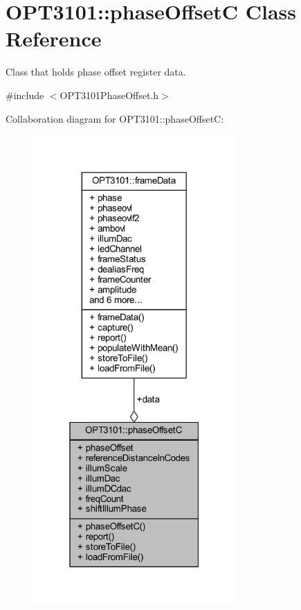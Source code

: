 \hypertarget{class_o_p_t3101_1_1phase_offset_c}{}\section{O\+P\+T3101\+:\+:phase\+OffsetC Class Reference}
\label{class_o_p_t3101_1_1phase_offset_c}


Class that holds phase offset register data.  




{\ttfamily \#include $<$O\+P\+T3101\+Phase\+Offset.\+h$>$}



Collaboration diagram for O\+P\+T3101\+:\+:phase\+OffsetC\+:\nopagebreak
\begin{figure}[H]
\begin{center}
\leavevmode
\includegraphics[width=219pt]{class_o_p_t3101_1_1phase_offset_c__coll__graph}
\end{center}
\end{figure}
